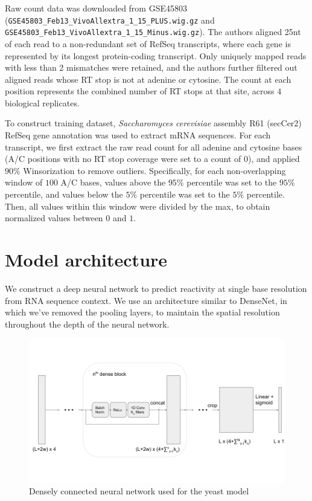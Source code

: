\documentclass{proposal}
\begin{document}
Raw count data was downloaded from GSE45803 (\verb|GSE45803_Feb13_VivoAllextra_1_15_PLUS.wig.gz| and \verb|GSE45803_Feb13_VivoAllextra_1_15_Minus.wig.gz|).
The authors aligned 25nt of each read to a non-redundant set of RefSeq transcripts,
where each gene is represented by its longest protein-coding transcript.
Only uniquely mapped reads with less than 2 mismatches were retained,
and the authors further filtered out aligned reads whose RT stop is not at adenine or cytosine.
The count at each position represents the combined number of RT stops at that site, across $4$ biological replicates.

To construct training dataset, \textit{Saccharomyces cerevisiae} assembly R61 (secCer2) RefSeq gene annotation was used to extract mRNA sequences.
For each transcript, we first extract the raw read count for all adenine and cytosine bases
(A/C positions with no RT stop coverage were set to a count of $0$),
and applied ﻿$90\%$ Winsorization to remove outliers.
Specifically, for each non-overlapping window of $100$ A/C bases, values above the $95\%$ percentile was set to the $95\%$ percentile,
and values below the $5\%$ percentile was set to the $5\%$ percentile.
Then, all values within this window were divided by the max, to obtain normalized values between $0$ and $1$.

\section{Model architecture}


We construct a deep neural network to predict reactivity at single base resolution from RNA sequence context.
We use an architecture similar to DenseNet\cite{huang2017densely},
in which we've removed the pooling layers, to maintain the spatial resolution throughout the depth of the neural network.


\begin{figure}
\includegraphics[width=\textwidth]{proposal_dense_net.png}
\caption{Densely connected neural network used for the yeast model}
\label{fig:dense_net}
\centering
\end{figure}
\end{document}
